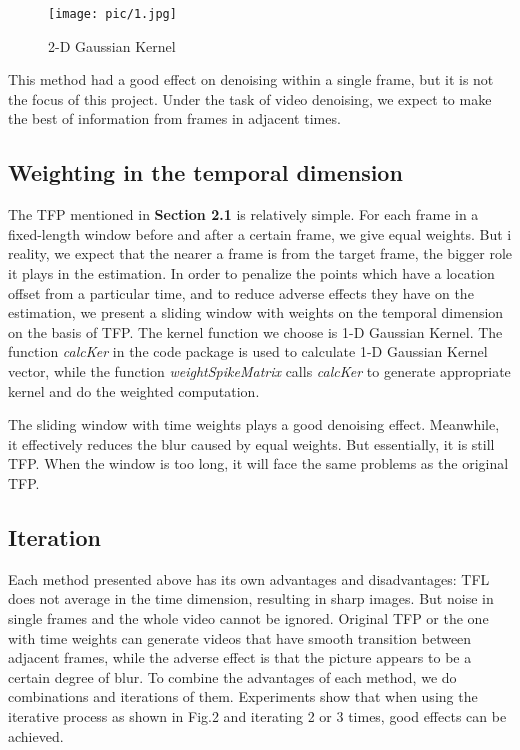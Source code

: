 \documentclass[10pt,twocolumn,letterpaper]{article}
\begin{document}
\begin{figure}[htp]
\texttt{[image: pic/1.jpg]}
\caption{2-D Gaussian Kernel}
\end{figure}


This method had a good effect on denoising within a single frame, but it is not the focus of this project. Under the task of video denoising, we expect to make the best of information from frames in adjacent times.

\subsection{Weighting in the temporal dimension}

The TFP mentioned in {\bf Section 2.1} is relatively simple. For each frame in a fixed-length window before and after a certain frame, we give equal weights. But i reality, we expect that the nearer a frame is from the target frame, the bigger role it plays in the estimation. In order to penalize the points which have a location offset from a particular time, and to reduce adverse effects they have on the estimation, we present a sliding window with weights on the temporal dimension on the basis of TFP. The kernel function we choose is 1-D Gaussian Kernel. The function \emph{calcKer} in the code package is used to calculate 1-D Gaussian Kernel vector, while the function \emph{weightSpikeMatrix} calls \emph{calcKer} to generate appropriate kernel and do the weighted computation.

The sliding window with time weights plays a good denoising effect. Meanwhile, it effectively reduces the blur caused by equal weights. But essentially, it is still TFP. When the window is too long, it will face the same problems as the original TFP.

\subsection{Iteration}

Each method presented above has its own advantages and disadvantages: TFL does not average in the time dimension, resulting in sharp images. But noise in single frames and the whole video cannot be ignored. Original TFP or the one with time weights can generate videos that have smooth transition between adjacent frames, while the adverse effect is that the picture appears to be a certain degree of blur. To combine the advantages of each method, we do combinations and iterations of them. Experiments show that when using the iterative process as shown in Fig.2 and iterating 2 or 3 times, good effects can be achieved.
\end{document}
